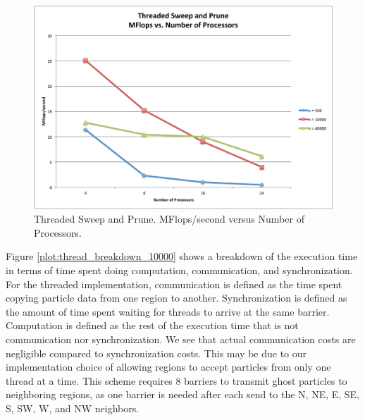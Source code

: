 \documentclass[11pt]{article} %
\begin{document}
\begin{figure}
\begin{centering}
\includegraphics[width=0.5\paperwidth]{figures/thread_flops_v_p}
\par\end{centering}

\caption{Threaded Sweep and Prune. MFlops/second versus Number of Processors.}
\label{plot:thread_flops_v_p}
\end{figure}


Figure \ref{plot:thread_breakdown_10000} shows a breakdown of the
execution time in terms of time spent doing computation, communication,
and synchronization. For the threaded implementation, communication
is defined as the time spent copying particle data from one region
to another. Synchronization is defined as the amount of time spent
waiting for threads to arrive at the same barrier. Computation is
defined as the rest of the execution time that is not communication
nor synchronization. We see that actual communication costs are negligible
compared to synchronization costs. This may be due to our implementation
choice of allowing regions to accept particles from only one thread
at a time. This scheme requires 8 barriers to transmit ghost particles
to neighboring regions, as one barrier is needed after each send
to the N, NE, E, SE, S, SW, W, and NW neighbors. 
\end{document}
